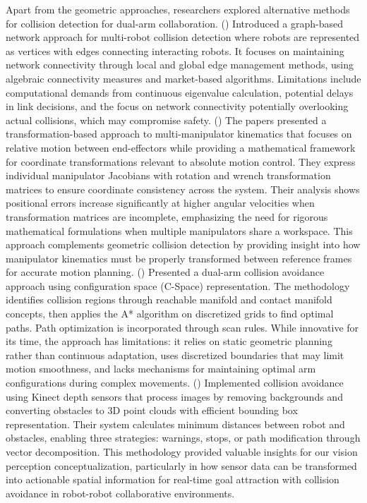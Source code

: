 \documentclass[utf8]{FrontiersinHarvard}
\begin{document}
Apart from the geometric approaches, researchers explored alternative methods for collision detection for dual-arm collaboration. (\citet{FENG2020113}) Introduced a graph-based network approach for multi-robot collision detection where robots are represented as vertices with edges connecting interacting robots. It focuses on maintaining network connectivity through local and global edge management methods, using algebraic connectivity measures and market-based algorithms. Limitations include computational demands from continuous eigenvalue calculation, potential delays in link decisions, and the focus on network connectivity potentially overlooking actual collisions, which may compromise safety. (\citet{JAMISOLA2015158, 7274617}) The papers presented a transformation-based approach to multi-manipulator kinematics that focuses on relative motion between end-effectors while providing a mathematical framework for coordinate transformations relevant to absolute motion control. They express individual manipulator Jacobians with rotation and wrench transformation matrices to ensure coordinate consistency across the system. Their analysis shows positional errors increase significantly at higher angular velocities when transformation matrices are incomplete, emphasizing the need for rigorous mathematical formulations when multiple manipulators share a workspace. This approach complements geometric collision detection by providing insight into how manipulator kinematics must be properly transformed between reference frames for accurate motion planning. (\citet{FEI2004351}) Presented a dual-arm collision avoidance approach using configuration space (C-Space) representation. The methodology identifies collision regions through reachable manifold and contact manifold concepts, then applies the A* algorithm on discretized grids to find optimal paths. Path optimization is incorporated through scan rules. While innovative for its time, the approach has limitations: it relies on static geometric planning rather than continuous adaptation, uses discretized boundaries that may limit motion smoothness, and lacks mechanisms for maintaining optimal arm configurations during complex movements. (\citet{SCHMIDT2014711}) Implemented collision avoidance using Kinect depth sensors that process images by removing backgrounds and converting obstacles to 3D point clouds with efficient bounding box representation. Their system calculates minimum distances between robot and obstacles, enabling three strategies: warnings, stops, or path modification through vector decomposition. This methodology provided valuable insights for our vision perception conceptualization, particularly in how sensor data can be transformed into actionable spatial information for real-time goal attraction with collision avoidance in robot-robot collaborative environments.
\end{document}
